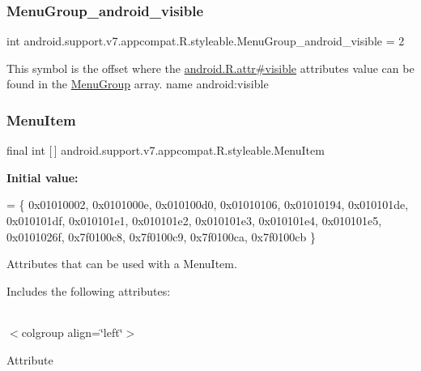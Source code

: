 \subsubsection{\texorpdfstring{Menu\+Group\+\_\+android\+\_\+visible}{MenuGroup\_android\_visible}}
{\footnotesize\ttfamily int android.\+support.\+v7.\+appcompat.\+R.\+styleable.\+Menu\+Group\+\_\+android\+\_\+visible = 2\hspace{0.3cm}{\ttfamily [static]}}

This symbol is the offset where the \hyperlink{}{android.\+R.\+attr\#visible} attribute\textquotesingle{}s value can be found in the \hyperlink{classandroid_1_1support_1_1v7_1_1appcompat_1_1R_1_1styleable_aef793c0a19e198b57791fed45ec2804e}{Menu\+Group} array.  name android\+:visible \mbox{\label{classandroid_1_1support_1_1v7_1_1appcompat_1_1R_1_1styleable_a3161bf75811c963572105d304c98b088}} 
\subsubsection{\texorpdfstring{Menu\+Item}{MenuItem}}
{\footnotesize\ttfamily final int \mbox{[}$\,$\mbox{]} android.\+support.\+v7.\+appcompat.\+R.\+styleable.\+Menu\+Item\hspace{0.3cm}{\ttfamily [static]}}

{\bfseries Initial value\+:}
\begin{DoxyCode}
= \{
            0x01010002, 0x0101000e, 0x010100d0, 0x01010106,
            0x01010194, 0x010101de, 0x010101df, 0x010101e1,
            0x010101e2, 0x010101e3, 0x010101e4, 0x010101e5,
            0x0101026f, 0x7f0100c8, 0x7f0100c9, 0x7f0100ca,
            0x7f0100cb
        \}
\end{DoxyCode}
Attributes that can be used with a Menu\+Item. 

Includes the following attributes\+:

\tabulinesep=1mm
\begin{longtabu} spread 0pt [c]{*{0}{|X[-1]}|}
\hline
\end{longtabu}
$<$colgroup align=\char`\"{}left\char`\"{}$>$ 

Attribute

